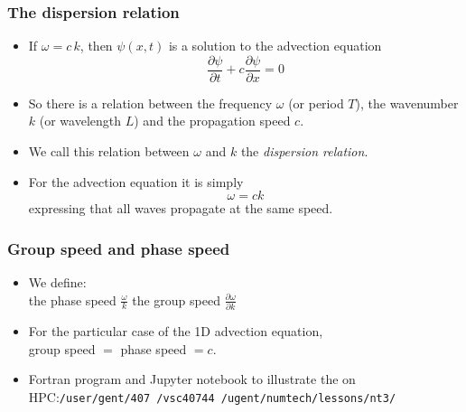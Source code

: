 \documentclass[aspectratio=43,9pt]{beamer}
\begin{document}
%
%
\begin{frame}
	\frametitle{The dispersion relation}
	\vfill\begin{itemize}
		\item If $\omega=c\,k$,	then $\psi(x,t)$ is a solution to the advection equation
			\begin{equation*}
				\frac{\partial \psi}{\partial t}+c\frac{\partial \psi}{\partial x}=0
			\end{equation*}\vfill
		\item So there is a relation between the frequency $\omega$ (or period $T$), the wavenumber $k$ (or wavelength $L$) and the propagation speed $c$.\vfill
		\item We call this relation between $\omega$ and $k$ the \emph{dispersion relation}.\vfill
		\item For the advection equation it is simply
			\begin{equation*}
				\omega = c k
			\end{equation*}
			expressing that all waves propagate at the same speed.
	\end{itemize}\vfill
\end{frame}
%
%
\begin{frame}
	\frametitle{Group speed and phase speed}
	\vfill\begin{itemize}
		\item We define:\\[2ex]
			\qquad the phase speed $\displaystyle\frac{\omega}k$
			\qquad the group speed $\displaystyle\frac{\partial \omega}{\partial k}$\vfill
		\item For the particular case of the 1D advection equation,\\[2ex]
			group speed $=$ phase speed $=c$.\vfill
		\item Fortran program and Jupyter notebook to illustrate the on HPC:\texttt{/user/gent/407 /vsc40744 /ugent/numtech/lessons/nt3/}
	\end{itemize}\vfill
\end{frame}
%
%
\end{document}
